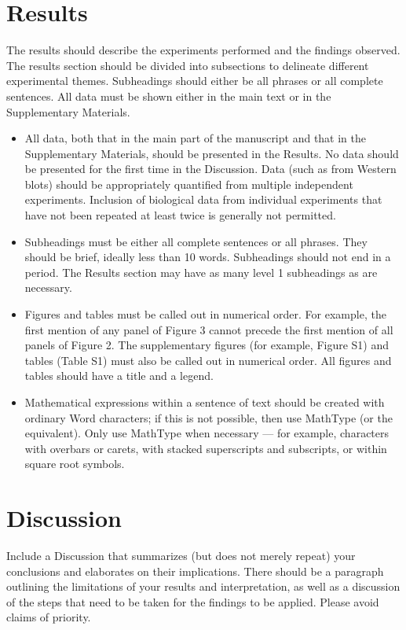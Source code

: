 \documentclass{article}
\begin{document}
\section{Results}
The results should describe the experiments performed and the findings observed. The results section should be divided into subsections to delineate different experimental themes. Subheadings should either be all phrases or all complete sentences. All data must be shown either in the main text or in the Supplementary Materials.  
\begin{itemize}
    \item All data, both that in the main part of the manuscript and that in the Supplementary Materials, should be presented in the Results. No data should be presented for the first time in the Discussion. Data (such as from Western blots) should be appropriately quantified from multiple independent experiments. Inclusion of biological data from individual experiments that have not been repeated at least twice is generally not permitted.
    \item Subheadings must be either all complete sentences or all phrases. They should be brief, ideally less than 10 words. Subheadings should not end in a period. The Results section may have as many level 1 subheadings as are necessary.
    \item Figures and tables must be called out in numerical order. For example, the first mention of any panel of Figure 3 cannot precede the first mention of all panels of Figure 2. The supplementary figures (for example, Figure S1) and tables (Table S1) must also be called out in numerical order. All figures and tables should have a title and a legend.
    \item Mathematical expressions within a sentence of text should be created with ordinary Word characters; if this is not possible, then use MathType (or the equivalent). Only use MathType when necessary — for example, characters with overbars or carets, with stacked superscripts and subscripts, or within square root symbols.
\end{itemize}

\section{Discussion}
Include a Discussion that summarizes (but does not merely repeat) your conclusions and elaborates on their implications. There should be a paragraph outlining the limitations of your results and interpretation, as well as a discussion of the steps that need to be taken for the findings to be applied. Please avoid claims of priority. 
\end{document}
